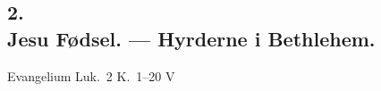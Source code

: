 \documentclass[12pt,a4paper]{book}
\begin{document}
\subsection*{2.\\[4pt] Jesu Fødsel. --- Hyrderne i Bethlehem.}

\begin{center}
  {\footnotesize Evangelium Luk.\ 2 K.\ 1--20 V}
\end{center}
\end{document}
